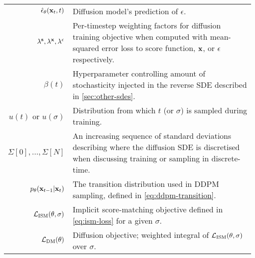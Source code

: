 \begin{table*}
\begin{tabular}{rp{9cm}}
    $\hat{\mathbf{\epsilon}}_\theta({\mathbf{x}}_t, t)$                      & Diffusion model's prediction of $\epsilon$. \\
    $\lambda^{\mathbf{s}}, \lambda^{\mathbf{x}}, \lambda^\epsilon$  & Per-timestep weighting factors for diffusion training objective when computed with mean-squared error loss to score function, ${\mathbf{x}}$, or $\epsilon$ respectively. \\
    $\beta(t)$                               & Hyperparameter controlling amount of stochasticity injected in the reverse SDE described in \cref{sec:other-sdes}. \\
    $u(t)$ or $u(\sigma)$                    & Distribution from which $t$ (or $\sigma$) is sampled during training. \\ 
    $\Sigma[0],\ldots,\Sigma[N]$             & An increasing sequence of standard deviations describing where the diffusion SDE is discretised when discussing training or sampling in discrete-time. \\
    $p_\theta({\mathbf{x}}_{t-1} | {\mathbf{x}}_t)$          & The transition distribution used in DDPM sampling, defined in \cref{eq:ddpm-transition}.  \\
    ${\mathcal{L}}_\text{ISM}(\theta, \sigma)$         &  Implicit score-matching objective defined in \cref{eq:ism-loss} for a given $\sigma$.  \\
    ${\mathcal{L}}_\text{DM}(\theta)$                  & Diffusion objective; weighted integral of ${\mathcal{L}}_\text{ISM}(\theta, \sigma)$ over $\sigma$. \\
    \bottomrule
  \end{tabular}
\end{table*}


